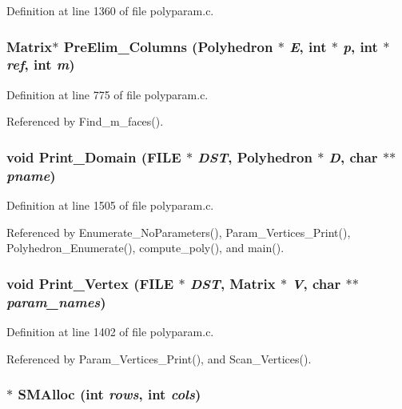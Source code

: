 Definition at line 1360 of file polyparam.c.
\subsubsection{\setlength{\rightskip}{0pt plus 5cm}Matrix$\ast$ Pre\-Elim\_\-Columns (Polyhedron $\ast$ {\em E}, int $\ast$ {\em p}, int $\ast$ {\em ref}, int {\em m})}\label{polyparam_8c_a31}




Definition at line 775 of file polyparam.c.

Referenced by Find\_\-m\_\-faces().

\subsubsection{\setlength{\rightskip}{0pt plus 5cm}void Print\_\-Domain (FILE $\ast$ {\em DST}, Polyhedron $\ast$ {\em D}, char $\ast$$\ast$ {\em pname})}\label{polyparam_8c_a39}




Definition at line 1505 of file polyparam.c.

Referenced by Enumerate\_\-No\-Parameters(), Param\_\-Vertices\_\-Print(), Polyhedron\_\-Enumerate(), compute\_\-poly(), and main().

\subsubsection{\setlength{\rightskip}{0pt plus 5cm}void Print\_\-Vertex (FILE $\ast$ {\em DST}, Matrix $\ast$ {\em V}, char $\ast$$\ast$ {\em param\_\-names})}\label{polyparam_8c_a37}




Definition at line 1402 of file polyparam.c.

Referenced by Param\_\-Vertices\_\-Print(), and Scan\_\-Vertices().

\subsubsection{$\ast$ SMAlloc (int {\em rows}, int {\em cols})\hspace{0.3cm}{\tt  [static]}}\label{polyparam_8c_a23}




